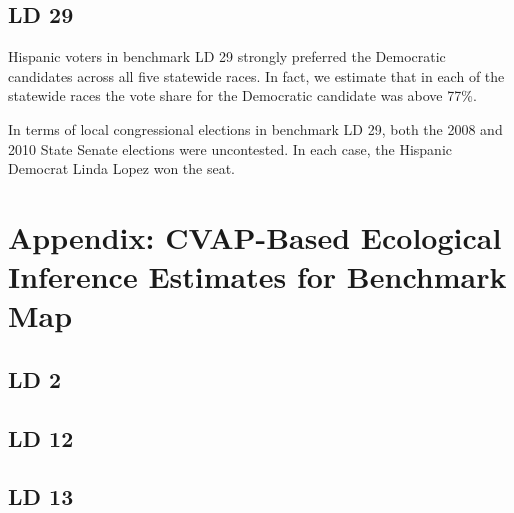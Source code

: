 \documentclass[12pt]{article}
\begin{document}
\subsection{LD 29}

Hispanic voters in benchmark LD 29 strongly preferred the Democratic candidates across all five statewide races. In fact, we estimate that in each of the statewide races the vote share for the Democratic candidate was above 77\%. 

In terms of local congressional elections in benchmark LD 29, both the 2008 and 2010 State Senate elections were uncontested. In each case, the Hispanic Democrat Linda Lopez won the seat.

\clearpage
\appendix

\section{Appendix: CVAP-Based Ecological Inference Estimates for Benchmark Map}

\subsection{LD 2}









\clearpage

\subsection{LD 12}







\clearpage
\begin{landscape}

\end{landscape}
\clearpage



\clearpage


\subsection{LD 13}
\end{document}
